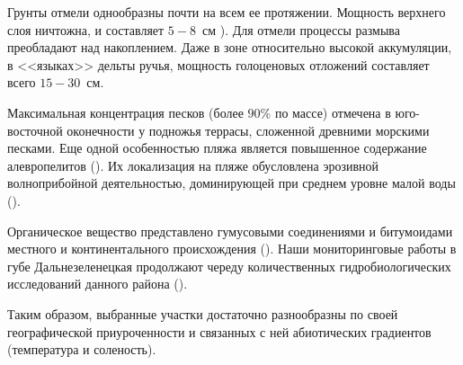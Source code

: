 Грунты отмели однообразны почти на всем ее протяжении. 
Мощность верхнего слоя ничтожна, и составляет $5 - 8$~см \cite{Prigorovskiy_1948}). 
Для отмели процессы размыва преобладают над накоплением. 
Даже в зоне относительно высокой аккумуляции, в <<языках>> дельты ручья, мощность голоценовых отложений составляет всего $15 - 30$~см.

Максимальная концентрация песков (более $90$\% по массе) отмечена в юго-восточной оконечности у подножья террасы, сложенной древними морскими песками. Еще одной особенностью пляжа является повышенное содержание алевропелитов (\cite{Pavlova_1976}). 
Их локализация на пляже обусловлена эрозивной волноприбойной деятельностью, доминирующей при среднем уровне малой воды (\cite{Alexeev_1976}).

Органическое вещество представлено гумусовыми соединениями и битумоидами местного и континентального происхождения (\cite{Gurevich_Yakovleva_1976}).
Наши мониторинговые работы в губе Дальнезеленецкая продолжают череду количественных гидробиологических исследований данного района (\cite{Prigorovskiy_1948, Matveeva_et_al_1955, Streltsov_et_al_1974, Agarova_et_al_1976, Zhukov_1984}).


Таким образом, выбранные участки достаточно разнообразны по своей географической приуроченности и связанных с ней абиотических градиентов (температура и соленость).

